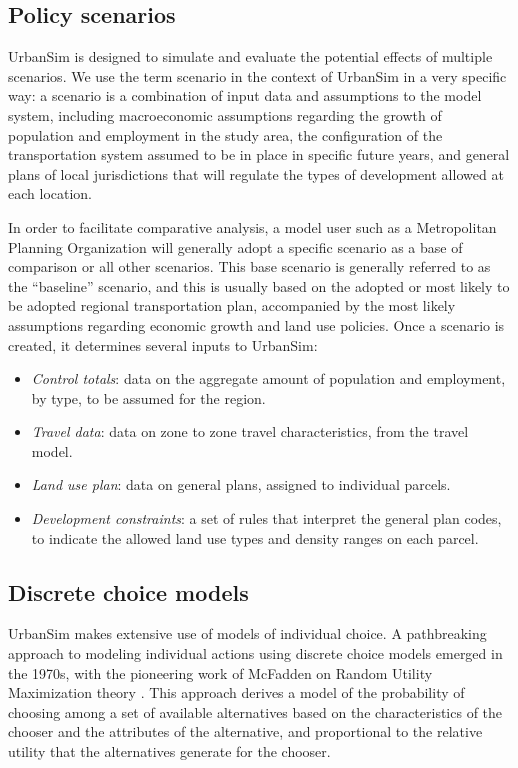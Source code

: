 \subsection{Policy scenarios}

UrbanSim is designed to simulate and evaluate the potential effects of multiple scenarios. We use the term scenario in the context of UrbanSim in a very specific way: a scenario is a combination of input data and assumptions to the model system, including macroeconomic assumptions regarding the growth of population and employment in the study area, the configuration of the transportation system assumed to be in place in specific future years, and general plans of local jurisdictions that will regulate the types of development allowed at each location.

In order to facilitate comparative analysis, a model user such as a Metropolitan Planning Organization will generally adopt a specific scenario as a base of comparison or all other scenarios. This base scenario is generally referred to as the \enquote{baseline} scenario, and this is usually based on the adopted or most likely to be adopted regional transportation plan, accompanied by the most likely assumptions regarding economic growth and land use policies. Once a scenario is created, it determines several inputs to UrbanSim:

\begin{itemize}
    \item \textit{Control totals}: data on the aggregate amount of population and employment, by type, to be assumed for the region.
    \item \textit{Travel data}: data on zone to zone travel characteristics, from the travel model.
    \item \textit{Land use plan}: data on general plans, assigned to individual parcels.
    \item \textit{Development constraints}: a set of rules that interpret the general plan codes, to indicate the allowed land use types and density ranges on each parcel.
\end{itemize}

\subsection{Discrete choice models}
\label{sec:discrete-choice}

UrbanSim makes extensive use of models of individual choice. A pathbreaking approach to modeling individual actions using discrete choice models emerged in the 1970s, with the pioneering work of McFadden on Random Utility Maximization theory
\citep{mcfadden-1974,mcfadden-1981}. This approach derives a model of the probability of choosing among a set of available alternatives based on the characteristics of the chooser and the attributes of the alternative, and proportional to the relative utility that the alternatives generate for the chooser.

